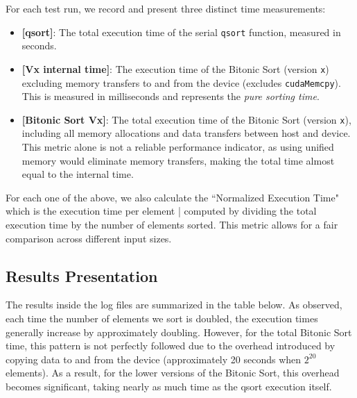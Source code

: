 \documentclass[12pt]{article}
\begin{document}
For each test run, we record and present three distinct time measurements:

\begin{itemize}[nosep]
    \item \textbf{[qsort]}: The total execution time of the serial \texttt{qsort} function, measured in seconds.
    \item \textbf{[Vx internal time]}: The execution time of the Bitonic Sort (version \texttt{x}) excluding memory transfers to and from the device (excludes \texttt{cudaMemcpy}). This is measured in milliseconds and represents the \textit{pure sorting time}.
    \item \textbf{[Bitonic Sort Vx]}: The total execution time of the Bitonic Sort (version \texttt{x}), including all memory allocations and data transfers between host and device. This metric alone is not a reliable performance indicator, as using unified memory would eliminate memory transfers, making the total time almost equal to the internal time.
\end{itemize}

For each one of the above, we also calculate the ``Normalized Execution Time" which is the execution time per element | computed by dividing the total execution time by the number of elements sorted. This metric allows for a fair comparison across different input sizes.

\subsection{Results Presentation}

The results inside the log files are summarized in the table below. As observed, each time the number of elements we sort is doubled, the execution times generally increase by approximately doubling. However, for the total Bitonic Sort time, this pattern is not perfectly followed due to the overhead introduced by copying data to and from the device (approximately 20 seconds when \( 2^{20} \) elements). As a result, for the lower versions of the Bitonic Sort, this overhead becomes significant, taking nearly as much time as the qsort execution itself.

\vspace{+10pt}
\end{document}
